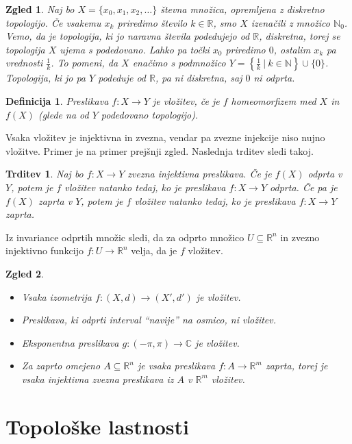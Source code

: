 \documentclass[10pt, a4paper]{article}
\newtheorem{trditev}[izr]{Trditev}
\newtheorem{defi}{Definicija}[section]
\newenvironment{noticeB}{%
  \tcolorbox[%
  notitle,
  empty,
  enhanced,  %
  breakable,
  coltext=black,
  colback=white, 
  fontupper=\rmfamily,
  parbox=false,
  noparskip,
  sharp corners,
  boxrule=-1pt,  %
  frame hidden,
  left=7pt,  %
  right=7pt,
  top=5pt,
  bottom=5pt,
  before skip=2.5ex plus 2pt,
  after skip=2.5ex plus 2pt,
  borderline west = {1.5pt}{-0.1pt}{blue!30!black}, %
  overlay unbroken and last={%
    \draw[color=black, line width=1.25pt]
    ($(frame.south west)+(1.pt, -0.1pt)$) -- ++(2em, 0);
  }
  ]}
{\endtcolorbox}
\newenvironment{definicija}{\begin{noticeB}\begin{defi}}{%
    \end{defi}\end{noticeB}}
\newtheorem{zgled}{Zgled}[section]
\newcommand{\N}{\mathbb {N}}
\newcommand{\R}{\mathbb {R}}
\newcommand{\C}{\mathbb {C}}
\begin{document}
\begin{zgled}
  Naj bo $X = \{x_0, x_1, x_2, \dots\}$ števna množica, opremljena z diskretno topologijo.
  Če vsakemu $x_k$ priredimo število $k \in \R$, smo $X$ izenačili z množico $\N_0$.
  Vemo, da je topologija, ki jo naravna števila podedujejo od $\R$, diskretna, torej se topologija $X$ ujema s podedovano.
  Lahko pa točki $x_0$ priredimo $0$, ostalim $x_k$ pa vrednosti $\frac{1}{k}$.
  To pomeni, da $X$ enačimo s podmnožico $Y = \left\lbrace\frac{1}{k}\ \Big|\ k \in \N \right\rbrace \cup \{0\}$.
  Topologija, ki jo pa $Y$ podeduje od $\R$, pa ni diskretna, saj $0$ ni odprta.
\end{zgled}

\begin{definicija}
  Preslikava $f: X \to Y$ je vložitev, če je $f$ homeomorfizem med $X$ in $f(X)$ (glede na od $Y$ podedovano topologijo).
\end{definicija}

Vsaka vložitev je injektivna in zvezna, vendar pa zvezne injekcije niso nujno vložitve.
Primer je na primer prejšnji zgled. Naslednja trditev sledi takoj.

\begin{trditev}
  Naj bo $f: X \to Y$ zvezna injektivna preslikava.
  Če je $f(X)$ odprta v $Y$, potem je $f$ vložitev natanko tedaj, ko je preslikava $f: X \to Y$ odprta.
  Če pa je $f(X)$ zaprta v $Y$, potem je $f$ vložitev natanko tedaj, ko je preslikava $f: X \to Y$ zaprta.
\end{trditev}

Iz invariance odprtih množic sledi, da za odprto množico $U \subseteq \R^n$ in zvezno injektivno
funkcijo $f: U \to \R^n$ velja, da je $f$ vložitev.

\begin{zgled}
  \begin{itemize}
    \item Vsaka izometrija $f: (X, d) \to (X', d')$ je vložitev.
    \item Preslikava, ki odprti interval "`navije"' na osmico, ni vložitev.
    \item Eksponentna preslikava $g: (-\pi, \pi) \to \C$ je vložitev.
    \item Za zaprto omejeno $A \subseteq \R^n$ je vsaka preslikava $f: A \to \R^m$ zaprta,
    torej je vsaka injektivna zvezna preslikava iz $A$ v $\R^m$ vložitev.
  \end{itemize}
\end{zgled}
\clearpage
\section{Topološke lastnosti}
\end{document}
